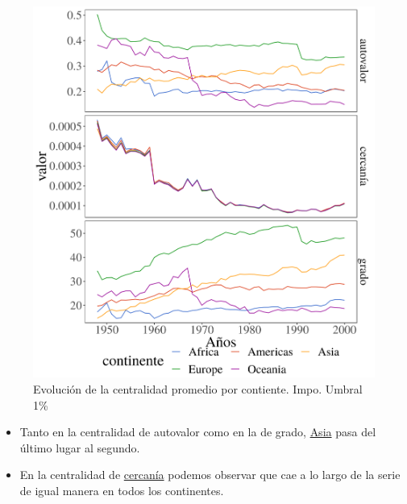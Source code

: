 \documentclass[compress]{beamer}
\begin{document}
\begin{frame}
	\begin{figure}
		\centering		\includegraphics[width=0.75\linewidth]{1950_2000_continent_all}
		\caption{Evolución de la centralidad promedio por contiente. Impo. Umbral 1\%}
		\label{fig:centralidad_LP}
	\end{figure}
\end{frame}

\begin{frame}
\begin{itemize}[label=\faRebel]
	\item Tanto en la centralidad de autovalor como en la de grado, \underline{Asia} pasa del último lugar al segundo. 
	\item En la centralidad de \underline{cercanía} podemos observar que cae a lo largo de la serie de igual manera en todos los continentes.
\end{itemize}
\end{frame}
\end{document}
